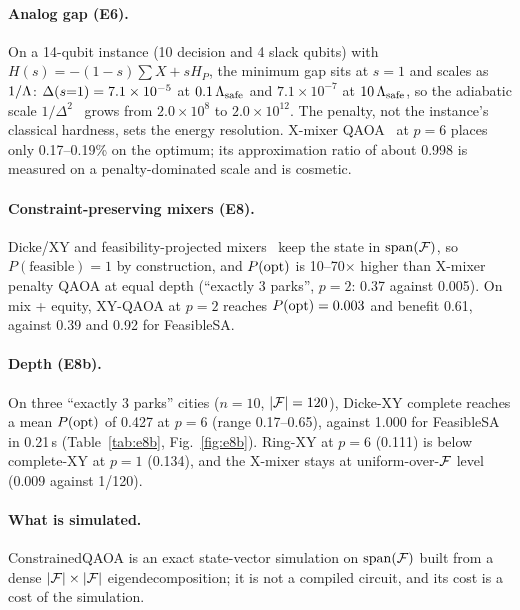 \paragraph{Analog gap (E6).} On a 14-qubit instance (10 decision and 4 slack qubits) with
$H(s)=-(1-s)\sum X+sH_P$, the minimum gap sits at $s=1$ and scales as $1/\Lambda$: $\Delta(s{=}1)=7.1\times10^{-5}$
at $0.1\,\Lambda_{\mathrm{safe}}$ and $7.1\times10^{-7}$ at $10\,\Lambda_{\mathrm{safe}}$, so the adiabatic scale
$1/\Delta^2$~\cite{albash2018} grows from $2.0\times10^{8}$ to $2.0\times10^{12}$. The
penalty, not the instance's classical hardness, sets the energy resolution. X-mixer
QAOA~\cite{farhi2014} at $p=6$ places only 0.17--0.19\% on the optimum; its approximation
ratio of about 0.998 is measured on a penalty-dominated scale and is cosmetic.

\paragraph{Constraint-preserving mixers (E8).} Dicke/XY and feasibility-projected
mixers~\cite{hadfield2019} keep the state in $\mathrm{span}(\mathcal{F})$, so $P(\mathrm{feasible})=1$ by
construction, and $P(\mathrm{opt})$ is 10--70$\times$ higher than X-mixer penalty QAOA at equal depth
(``exactly 3 parks'', $p=2$: 0.37 against 0.005). On mix + equity, XY-QAOA at $p=2$ reaches
$P(\mathrm{opt})=0.003$ and benefit 0.61, against 0.39 and 0.92 for FeasibleSA.

\paragraph{Depth (E8b).} On three ``exactly 3 parks'' cities ($n=10$, $|\mathcal{F}|=120$), Dicke-XY
complete reaches a mean $P(\mathrm{opt})$ of 0.427 at $p=6$ (range 0.17--0.65), against 1.000 for FeasibleSA
in 0.21\,s (Table~\ref{tab:e8b}, Fig.~\ref{fig:e8b}). Ring-XY at $p=6$ (0.111) is below complete-XY
at $p=1$ (0.134), and the X-mixer stays at uniform-over-$\mathcal{F}$ level (0.009 against 1/120).

\paragraph{What is simulated.} ConstrainedQAOA is an exact state-vector simulation on
$\mathrm{span}(\mathcal{F})$ built from a dense $|\mathcal{F}|\times|\mathcal{F}|$ eigendecomposition; it is not a
compiled circuit, and its cost is a cost of the simulation.
